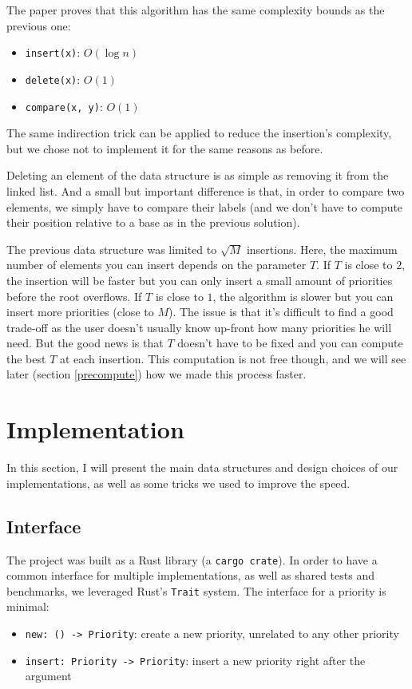 \documentclass[12pt]{article}
\begin{document}
The paper proves that this algorithm has the same complexity bounds as the previous one:
\begin{itemize}
  \item \texttt{insert(x)}: $O(\log n)$
  \item \texttt{delete(x)}: $O(1)$
  \item \texttt{compare(x, y)}: $O(1)$
\end{itemize}

The same indirection trick can be applied to reduce the insertion's complexity, but we chose not to implement it for the same reasons as before.

Deleting an element of the data structure is as simple as removing it from the linked list.
And a small but important difference is that, in order to compare two elements, we simply have to compare their labels (and we don't have to compute their position relative to a base as in the previous solution).

The previous data structure was limited to $\sqrt{M}$ insertions. Here, the maximum number of elements you can insert depends on the parameter $T$. If $T$ is close to $2$, the insertion will be faster but you can only insert a small amount of priorities before the root overflows. If $T$ is close to $1$, the algorithm is slower but you can insert more priorities (close to $M$).
The issue is that it's difficult to find a good trade-off as the user doesn't usually know up-front how many priorities he will need.
But the good news is that $T$ doesn't have to be fixed and you can compute the best $T$ at each insertion.
This computation is not free though, and we will see later (section \ref{precompute}) how we made this process faster.

\newpage
\section{Implementation}

In this section, I will present the main data structures and design choices of our implementations, as well as some tricks we used to improve the speed.

\subsection{Interface}

The project was built as a Rust library (a \lstinline{cargo crate}). In order to have a common interface for multiple implementations, as well as shared tests and benchmarks, we leveraged Rust's \lstinline{Trait} system. The interface for a priority is minimal:
\begin{itemize}
  \item \lstinline{new: () -> Priority}: create a new priority, unrelated to any other priority
  \item \lstinline{insert: Priority -> Priority}: insert a new priority right after the argument
\end{itemize}
\end{document}
